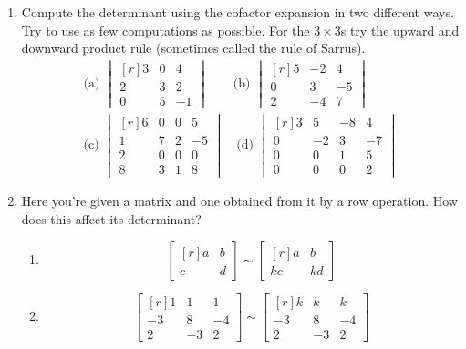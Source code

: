\documentclass[12pt]{article}
\begin{document}
\begin{multicols*}{2}
\begin{enumerate}
		\item Compute the determinant using the cofactor expansion in two different ways. Try to use as few computations as possible. For the $3\times 3$s try the upward and downward product rule (sometimes called the rule of Sarrus).
		\begin{gather*}
		\text{(a)\ }\begin{vmatrix*}[r]
			3 & 0 & 4\\
			2 & 3 & 2\\
			0 & 5 & -1
		\end{vmatrix*}\qquad \text{(b)\ }
		\begin{vmatrix*}[r]
			5 & -2 & 4\\
			0 & 3 & -5\\
			2 & -4 & 7
		\end{vmatrix*}\\
		\text{(c)\ }\begin{vmatrix*}[r]
			6 & 0 & 0 & 5\\
			1 & 7 & 2 & -5\\
			2 & 0 & 0 & 0\\
			8 & 3 & 1 & 8
		\end{vmatrix*}\quad \text{(d)\ }\begin{vmatrix*}[r]
			3 & 5 & -8 & 4\\
			0 & -2 & 3 & -7\\
			0 & 0 & 1 & 5\\
			0 & 0 & 0 & 2
		\end{vmatrix*}
		\end{gather*}

		\vfill

		\item Here you're given a matrix and one obtained from it by a row operation. How does this affect its determinant?
		\begin{enumerate}
		\item \[
		\begin{bmatrix*}[r]
			a & b\\
			c & d
		\end{bmatrix*}\sim \begin{bmatrix*}[r]
			a & b\\
			kc & kd
		\end{bmatrix*}
		\]
		\vfill

		\item \[
		\begin{bmatrix*}[r]
			1 & 1 & 1\\
			-3 & 8 & -4\\
			2 & -3 & 2
		\end{bmatrix*}\sim \begin{bmatrix*}[r]
			k & k & k\\
			-3 & 8 & -4\\
			2 & -3 & 2
		\end{bmatrix*}
		\]
		\vfill


\end{enumerate}
\end{enumerate}
\end{multicols*}
\end{document}
